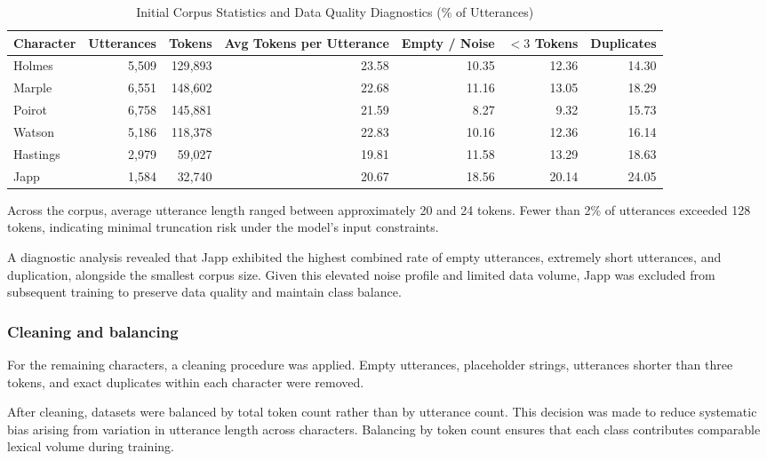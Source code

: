 \documentclass{article}
\begin{document}
\begin{table}[h]
    \centering
    \caption{Initial Corpus Statistics and Data Quality Diagnostics (\% of Utterances)}
    \label{tab:placeholder_label}
    \begin{tabular}{lrrrrrr}
        \toprule
        Character & Utterances & Tokens & Avg Tokens per Utterance & Empty / Noise & $<3$ Tokens & Duplicates \\
        \midrule
        Holmes   & 5{,}509 & 129{,}893 & 23.58 & 10.35 & 12.36 & 14.30 \\
        Marple   & 6{,}551 & 148{,}602 & 22.68 & 11.16 & 13.05 & 18.29 \\
        Poirot   & 6{,}758 & 145{,}881 & 21.59 &  8.27 &  9.32 & 15.73 \\
        Watson   & 5{,}186 & 118{,}378 & 22.83 & 10.16 & 12.36 & 16.14 \\
        Hastings & 2{,}979 &  59{,}027 & 19.81 & 11.58 & 13.29 & 18.63 \\
        Japp     & 1{,}584 &  32{,}740 & 20.67 & 18.56 & 20.14 & 24.05 \\
        \bottomrule
    \end{tabular}
\end{table}

Across the corpus, average utterance length ranged between approximately 20 and 24 tokens. Fewer than 2\% of utterances exceeded 128 tokens, indicating minimal truncation risk under the model’s input constraints.

A diagnostic analysis revealed that Japp exhibited the highest combined rate of empty utterances, extremely short utterances, and duplication, alongside the smallest corpus size. Given this elevated noise profile and limited data volume, Japp was excluded from subsequent training to preserve data quality and maintain class balance.

\subsubsection{Cleaning and balancing}

For the remaining characters, a cleaning procedure was applied. Empty utterances, placeholder strings, utterances shorter than three tokens, and exact duplicates within each character were removed.

After cleaning, datasets were balanced by total token count rather than by utterance count. This decision was made to reduce systematic bias arising from variation in utterance length across characters. Balancing by token count ensures that each class contributes comparable lexical volume during training.
\end{document}
